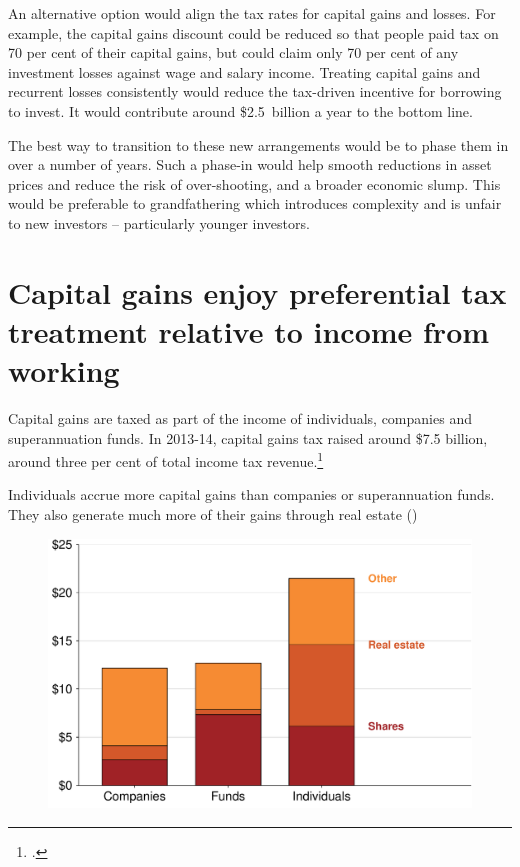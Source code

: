\documentclass{grattan}\usepackage[]{graphicx}\usepackage[]{color}
\begin{document}
An alternative option would align the tax rates for capital gains and losses.  For example, the capital gains discount could be reduced so that people paid tax on 70 per cent of their capital gains, but could claim only 70 per cent of any investment losses against wage and salary income. Treating capital gains and recurrent losses consistently would reduce the tax-driven incentive for borrowing to invest. It would contribute around \$2.5~billion a year to the bottom line.

The best way to transition to these new arrangements would be to phase them in over a number of years. Such a phase-in would help smooth reductions in asset prices and reduce the risk of over-shooting, and a broader economic slump. This would be preferable to grandfathering which introduces complexity and is unfair to new investors -- particularly younger investors.

\section{Capital gains enjoy preferential tax treatment relative to income from working}
Capital gains are taxed as part of the income of individuals, companies and superannuation funds. In 2013-14, capital gains tax raised around \$7.5 billion, around three per cent of total income tax revenue.\footcite{Treasury2014a} 

Individuals accrue more capital gains than companies or superannuation funds. They also generate much more of their gains through real estate ()


\begin{figure}[h]
\includegraphics[width=\columnwidth]{figure/Majority_of_taxable_gains_are_earned_by_individuals-1}
\end{figure}
\end{document}
